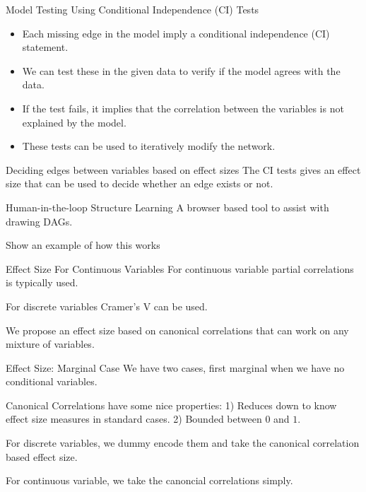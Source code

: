 \documentclass{beamer}
\begin{document}
\begin{frame}{Model Testing Using Conditional Independence (CI) Tests}

	\begin{itemize}
		\item Each missing edge in the model imply a conditional independence (CI) statement. 
		\item We can test these in the given data to verify if the model agrees with the data.
		\item If the test fails, it implies that the correlation between the variables is not explained by the model.
		\item These tests can be used to iteratively modify the network.
	\end{itemize}
\end{frame}

\begin{frame}{Deciding edges between variables based on effect sizes}
	The CI tests gives an effect size that can be used to decide whether an edge exists or not.

\end{frame}

\begin{frame}{Human-in-the-loop Structure Learning}
	A browser based tool to assist with drawing DAGs.
	\begin{itemize}
		
	\end{itemize}
\end{frame}

\begin{frame}{Show an example of how this works}
\end{frame}

\begin{frame}{Effect Size For Continuous Variables}
	For continuous variable partial correlations is typically used.

	For discrete variables Cramer's V can be used.

	We propose an effect size based on canonical correlations that can work on any mixture of variables.
\end{frame}

\begin{frame}{Effect Size: Marginal Case}
	We have two cases, first marginal when we have no conditional variables.

	Canonical Correlations have some nice properties: 1) Reduces down to know effect size measures in standard cases. 2) Bounded between $ 0 $ and $ 1 $.

	For discrete variables, we dummy encode them and take the canonical correlation based effect size.

	For continuous variable, we take the canoncial correlations simply.
\end{frame}
\end{document}

